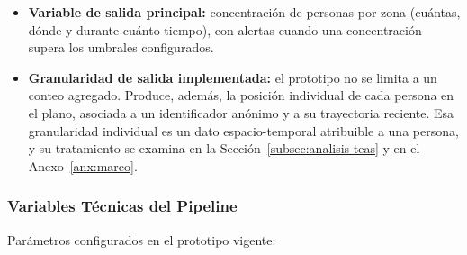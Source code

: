 \begin{itemize}
  \item \textbf{Variable de salida principal:} concentración de personas por zona (cuántas,
  dónde y durante cuánto tiempo), con alertas cuando una concentración supera los umbrales
  configurados.
  \item \textbf{Granularidad de salida implementada:} el prototipo no se limita a un conteo
  agregado. Produce, además, la posición individual de cada persona en el plano, asociada a un
  identificador anónimo y a su trayectoria reciente. Esa granularidad individual es un dato
  espacio-temporal atribuible a una persona, y su tratamiento se examina en la
  Sección~\ref{subsec:analisis-teas} y en el Anexo~\ref{anx:marco}.
\end{itemize}

\subsubsection{Variables Técnicas del Pipeline}

Parámetros configurados en el prototipo vigente:

